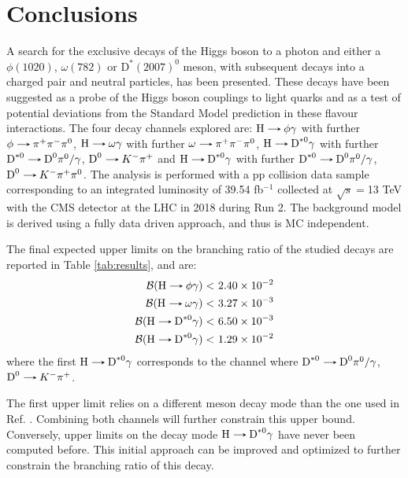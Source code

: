 \chapter*{Conclusions}\label{chap:conclusions}

A search for the exclusive decays of the Higgs boson to a photon and either a $\phi(1020)$, $\omega(782)$ or $\text{D}^{*}(2007)^{0}$ meson, with subsequent decays into a charged pair and neutral particles, has been presented. These decays have been suggested as a probe of the Higgs boson couplings to light quarks and as a test of potential deviations from the Standard Model prediction in these flavour interactions. The four decay channels explored are: $\text{H}\decaysto \phi\gamma$ with further $\phi\decaysto \pi^+\pi^-\pi^0$, $\text{H}\decaysto \omega\gamma$ with further $\omega\decaysto \pi^+\pi^-\pi^0$, $\text{H}\decaysto \text{D}^{*0}\gamma$ with further $\text{D}^{*0}\decaysto \text{D}^{0}\pi^{0}/\gamma$, $\text{D}^{0}\decaysto K^{-}\pi^{+}$ and $\text{H}\decaysto \text{D}^{*0}\gamma$ with further $\text{D}^{*0}\decaysto \text{D}^{0}\pi^{0}/\gamma$, $\text{D}^{0}\decaysto K^{-}\pi^{+}\pi^{0}$. The analysis is performed with a pp collision data sample corresponding to an integrated luminosity of 39.54 fb$^{-1}$ collected at $\sqrt{s}=$13 TeV with the CMS detector at the LHC in 2018 during Run 2. The background model is derived using a fully data driven approach, and thus is MC independent.

The final expected upper limits on the branching ratio of the studied decays are reported in Table \ref{tab:results}, and are:
\begin{equation*}
    \begin{aligned}
        \mathcal{B}(\text{H}\decaysto \phi\gamma) <&\ 2.40 \times 10^{-2}\\
        \mathcal{B}(\text{H}\decaysto \omega\gamma) <&\ 3.27 \times 10^{-3}\\
        \mathcal{B}(\text{H}\decaysto\text{D}^{*0}\gamma) <&\ 6.50 \times 10^{-3}\\
        \mathcal{B}(\text{H}\decaysto\text{D}^{*0}\gamma) <&\ 1.29 \times 10^{-2}\\
\end{aligned}
\end{equation*}
where the first $\text{H}\decaysto\text{D}^{*0}\gamma$ corresponds to the channel where $\text{D}^{*0}\decaysto \text{D}^{0}\pi^{0}/\gamma$, $\text{D}^{0}\decaysto K^{-}\pi^{+}$.

The first upper limit relies on a different meson decay mode than the one used in Ref. \cite{ATLAS:2017gko}. Combining both channels will further constrain this upper bound. Conversely, upper limits on the decay mode $\text{H}\decaysto\text{D}^{*0}\gamma$ have never been computed before. This initial approach can be improved and optimized to further constrain the branching ratio of this decay.

